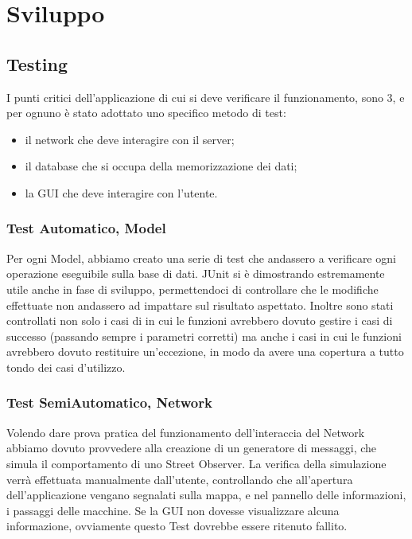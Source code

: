 \documentclass[a4paper,12pt]{report}
\begin{document}
\chapter{Sviluppo}

\section{Testing}

  I punti critici dell'applicazione di cui si deve verificare il funzionamento, 
  sono 3, e per ognuno è stato adottato uno specifico metodo di test: 
  \begin{itemize}
    \item il network che deve interagire con il server;
    \item il database che si occupa della memorizzazione dei dati;
    \item la GUI che deve interagire con l'utente.
  \end{itemize}


  \subsection{Test Automatico, Model}

    Per ogni Model, abbiamo creato una serie di test che andassero a verificare 
    ogni operazione eseguibile sulla base di dati.\newline
    JUnit si è dimostrando estremamente utile anche in fase di sviluppo, 
    permettendoci di controllare che le modifiche effettuate non andassero ad 
    impattare sul risultato aspettato. Inoltre sono stati controllati non solo 
i casi di in cui le funzioni avrebbero   dovuto gestire i casi di successo 
(passando sempre i parametri corretti) ma   anche i casi in cui le funzioni 
avrebbero dovuto restituire un'eccezione, in   modo da avere una copertura a 
tutto tondo dei casi d'utilizzo.


  \subsection{Test SemiAutomatico, Network}
    Volendo dare prova pratica del funzionamento dell'interaccia del Network 
    abbiamo dovuto provvedere alla creazione di un generatore di messaggi, che 
    simula il comportamento di uno Street Observer.\newline
    La verifica della simulazione verrà effettuata manualmente dall'utente, 
    controllando che all'apertura dell'applicazione vengano segnalati sulla 
  mappa, e nel pannello delle informazioni, i passaggi delle macchine. Se la 
GUI non dovesse visualizzare alcuna informazione, ovviamente questo 
  Test dovrebbe essere ritenuto fallito.
\end{document}
